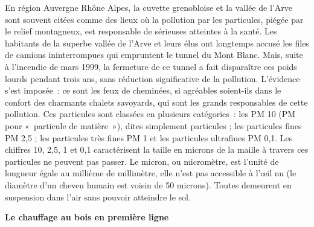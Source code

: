 \documentclass[8pt]{article}
\begin{document}
En région Auvergne Rhône Alpes, la cuvette grenobloise et la vallée de l’Arve sont souvent citées comme des lieux où la pollution par les particules, piégée par le relief montagneux, est responsable de sérieuses atteintes à la santé. Les habitants de la superbe vallée de l’Arve et leurs élus ont longtemps accusé les files de camions ininterrompues qui empruntent le tunnel du Mont Blanc. Mais, suite à l’incendie de mars 1999, la fermeture de ce tunnel a fait disparaître ces poids lourds pendant trois ans, sans réduction significative de la pollution. L’évidence s’est imposée~: ce sont les feux de cheminées, si agréables soient-ils dans le confort des charmants chalets savoyards, qui sont les grands responsables de cette pollution.
Ces particules sont classées en plusieurs catégories~: les PM 10 (PM pour «~particule de matière~»), dites simplement particules ; les particules fines PM 2,5 ; les particules très fines PM 1 et les particules ultrafines PM 0,1. Les chiffres 10, 2,5, 1 et 0,1 caractérisent la taille en microns de la maille à travers ces particules ne peuvent pas passer. Le micron, ou micromètre, est l’unité de longueur égale au millième de millimètre, elle n’est pas accessible à l’œil nu (le diamètre d’un cheveu humain est voisin de 50 microns). Toutes demeurent en suspension dans l’air sans pouvoir atteindre le sol.\\

\begin{center}
\end{center}

\textbf{Le chauffage au bois en première ligne}\\
\end{document}
